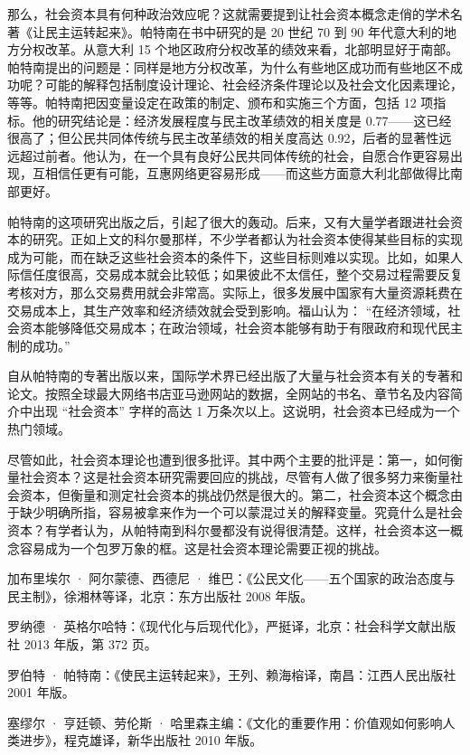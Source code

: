 那么，社会资本具有何种政治效应呢？这就需要提到让社会资本概念走俏的学术名著《让民主运转起来》。帕特南在书中研究的是 20 世纪 70 到 90 年代意大利的地方分权改革。从意大利 15 个地区政府分权改革的绩效来看，北部明显好于南部。帕特南提出的问题是：同样是地方分权改革，为什么有些地区成功而有些地区不成功呢？可能的解释包括制度设计理论、社会经济条件理论以及社会文化因素理论，等等。帕特南把因变量设定在政策的制定、颁布和实施三个方面，包括 12 项指标。他的研究结论是：经济发展程度与民主改革绩效的相关度是 0.77——这已经很高了；但公民共同体传统与民主改革绩效的相关度高达 0.92，后者的显著性远远超过前者。他认为，在一个具有良好公民共同体传统的社会，自愿合作更容易出现，互相信任更有可能，互惠网络更容易形成——而这些方面意大利北部做得比南部更好。

帕特南的这项研究出版之后，引起了很大的轰动。后来，又有大量学者跟进社会资本的研究。正如上文的科尔曼那样，不少学者都认为社会资本使得某些目标的实现成为可能，而在缺乏这些社会资本的条件下，这些目标则难以实现。比如，如果人际信任度很高，交易成本就会比较低；如果彼此不太信任，整个交易过程需要反复考核对方，那么交易费用就会非常高。实际上，很多发展中国家有大量资源耗费在交易成本上，其生产效率和经济绩效就会受到影响。福山认为： “在经济领域，社会资本能够降低交易成本；在政治领域，社会资本能够有助于有限政府和现代民主制的成功。” 

自从帕特南的专著出版以来，国际学术界已经出版了大量与社会资本有关的专著和论文。按照全球最大网络书店亚马逊网站的数据，全网站的书名、章节名及内容简介中出现 “社会资本” 字样的高达 1 万条次以上。这说明，社会资本已经成为一个热门领域。

尽管如此，社会资本理论也遭到很多批评。其中两个主要的批评是：第一，如何衡量社会资本？这是社会资本研究需要回应的挑战，尽管有人做了很多努力来衡量社会资本，但衡量和测定社会资本的挑战仍然是很大的。第二，社会资本这个概念由于缺少明确所指，容易被拿来作为一个可以蒙混过关的解释变量。究竟什么是社会资本？有学者认为，从帕特南到科尔曼都没有说得很清楚。这样，社会资本这一概念容易成为一个包罗万象的框。这是社会资本理论需要正视的挑战。


加布里埃尔 · 阿尔蒙德、西德尼 · 维巴：《公民文化——五个国家的政治态度与民主制》，徐湘林等译，北京：东方出版社 2008 年版。

罗纳德 · 英格尔哈特：《现代化与后现代化》，严挺译，北京：社会科学文献出版社 2013 年版，第 372 页。

罗伯特 · 帕特南：《使民主运转起来》，王列、赖海榕译，南昌：江西人民出版社 2001 年版。

塞缪尔 · 亨廷顿、劳伦斯 · 哈里森主编：《文化的重要作用：价值观如何影响人类进步》，程克雄译，新华出版社 2010 年版。

